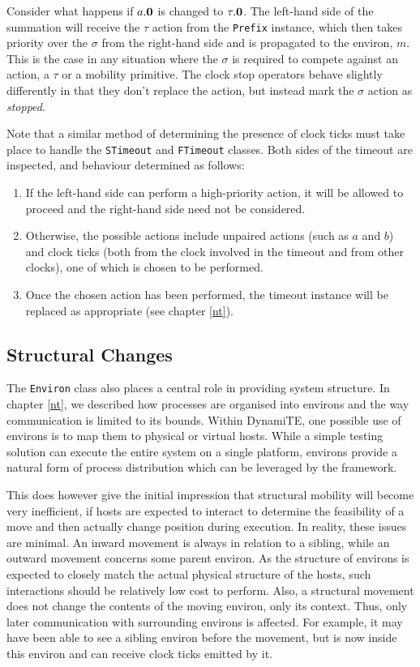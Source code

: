 Consider what happens if $a.\textbf{0}$ is changed to $\tau.\textbf{0}$.  The
left-hand side of the summation will receive the $\tau$ action from the
\texttt{Prefix} instance, which then takes priority over the $\sigma$
from the right-hand side and is propagated to the environ, $m$.  This is
the case in any situation where the $\sigma$ is required to compete
against an action, a $\tau$ or a mobility primitive.  The clock stop
operators behave slightly differently in that they don't replace the
action, but instead mark the $\sigma$ action as \emph{stopped}.

Note that a similar method of determining the presence of clock ticks
must take place to handle the \texttt{STimeout} and \texttt{FTimeout}
classes.  Both sides of the timeout are inspected, and behaviour
determined as follows:
\begin{enumerate}
\item If the left-hand side can perform a high-priority action, it will
      be allowed to proceed and the right-hand side need not be
      considered.
\item Otherwise, the possible actions include unpaired actions (such as
      $a$ and $b$) and clock ticks (both from the clock involved in the
      timeout and from other clocks), one of which is chosen to be
      performed.
\item Once the chosen action has been performed, the timeout instance
      will be replaced as appropriate (see chapter \ref{nt}). 
\end{enumerate}

\subsection{Structural Changes}
\label{dyn:structchange}

The \texttt{Environ} class also places a central role in providing
system structure.  In chapter \ref{nt}, we described how
processes are organised into environs and the way communication is
limited to its bounds.  Within DynamiTE, one possible use of environs
is to map them to physical or virtual hosts.  While a simple testing
solution can execute the entire system on a single platform, environs
provide a natural form of process distribution which can be leveraged by
the framework.

This does however give the initial impression that structural mobility
will become very inefficient, if hosts are expected to interact to
determine the feasibility of a move and then actually change position
during execution.  In reality, these issues are minimal.  An inward
movement is always in relation to a sibling, while an outward movement
concerns some parent environ.  As the structure of environs is expected
to closely match the actual physical structure of the hosts, such
interactions should be relatively low cost to perform.  Also, a
structural movement does not change the contents of the moving environ,
only its context.  Thus, only later communication with surrounding
environs is affected.  For example, it may have been able to see a
sibling environ before the movement, but is now inside this environ and
can receive clock ticks emitted by it.

